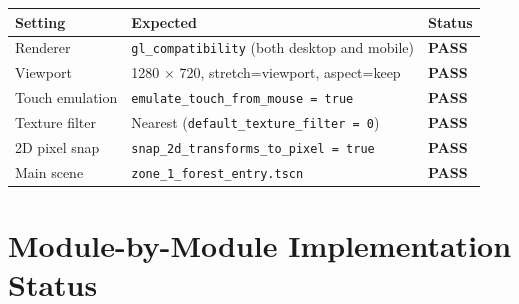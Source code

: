 \documentclass[12pt, a4paper]{article}
\newcommand{\statuspass}{\textcolor{passgre}{\textbf{PASS}}}
\begin{document}
\begin{center}
\begin{tabular}{lll}
\toprule
\textbf{Setting} & \textbf{Expected} & \textbf{Status} \\
\midrule
Renderer              & \texttt{gl\_compatibility} (both desktop and mobile) & \statuspass \\
Viewport              & 1280 $\times$ 720, stretch=viewport, aspect=keep       & \statuspass \\
Touch emulation       & \texttt{emulate\_touch\_from\_mouse = true}            & \statuspass \\
Texture filter        & Nearest (\texttt{default\_texture\_filter = 0})        & \statuspass \\
2D pixel snap         & \texttt{snap\_2d\_transforms\_to\_pixel = true}        & \statuspass \\
Main scene            & \texttt{zone\_1\_forest\_entry.tscn}                   & \statuspass \\
\bottomrule
\end{tabular}
\end{center}

\section{Module-by-Module Implementation Status}
\end{document}
